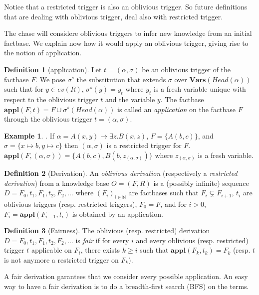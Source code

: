 \documentclass{article}
\theoremstyle{definition}
\newtheorem{definition}{Definition}[section]
\newtheorem{example}{Example}[section]
\theoremstyle{remark}
\def \N {\mathbb N}
\newcommand{\Vars}{\textbf{Vars}}
\newcommand{\Appl}{\textbf{appl}}
\begin{document}
Notice that a restricted trigger is also an oblivious trigger. So future definitions that are dealing with oblivious trigger, deal also with restricted trigger.

The chase will considere oblivious triggers to infer new knowledge from an initial factbase. We explain now how it would apply an oblivious trigger, giving rise to the notion of application. 

\begin{definition}[application]
Let $t = (\alpha,\sigma)$ be an oblivious trigger of the factbase $F$. We pose \emph{$\sigma^s$} the substitution that extends $\sigma$ over $\Vars(\textit{Head}(\alpha))$ such that for $y \in \textit{ev}(R)$, $\sigma^s(y) = y_t$ where $y_t$ is a fresh variable unique with respect to the oblivious trigger $t$ and the variable $y$.
The factbase $\Appl(F,t)=F \cup \sigma^s(\textit{Head}(\alpha))$ is called an \emph{application} on the factbase $F$ through the oblivious trigger $t = (\alpha,\sigma)$.
\end{definition}

\begin{example}. If $\alpha = A(x,y) \rightarrow \exists z.B(x,z)$, $F = \{A(b,c)\}$, and $\sigma = \{x \mapsto b, y \mapsto c \}$ then $(\alpha,\sigma)$ is a restricted trigger for $F$. $\Appl(F,(\alpha,\sigma)) = \{A(b,c),B(b,z_{(\alpha,\sigma)})\}$ where $z_{(\alpha,\sigma)}$ is a fresh variable.
\end{example}

\begin{definition}[Derivation]
An \emph{oblivious derivation} (respectively a \emph{restricted derivation}) from a knowledge base $O= (F,R)$ is a (possibly infinite) sequence $D=F_0,t_1,F_1,t_2,F_2,\ldots$ where $(F_i)_{i \in \N}$ are factbases such that $F_i \subsetneq F_{i+1}$, $t_i$ are oblivious triggers (resp. restricted triggers), $F_0 = F$, and for $i >0$, $F_{i}= \Appl(F_{i-1},t_i)$ is obtained by an application.
\end{definition}


\begin{definition}[Fairness]
The oblivious (resp. restricted) derivation $D=F_0,t_1,F_1,t_2,F_2,\ldots$ is \emph{fair} if for every $i$ and every oblivious (resp. restricted) trigger $t$ applicable on $F_i$, there exists $k \geq i$ such that $\Appl(F_{k},t_k) = F_k$ (resp. $t$ is not anymore a restricted trigger on $F_k$).
\end{definition}

A fair derivation garantees that we consider every possible application. An easy way to have a fair derivation is to do a breadth-first search (BFS) on the terms.
\end{document}

